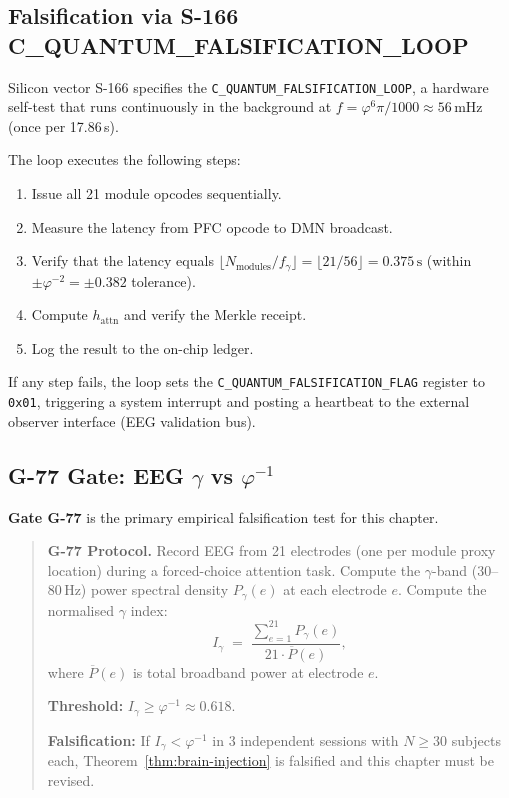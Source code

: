 \subsection{Falsification via S-166 C\_QUANTUM\_FALSIFICATION\_LOOP}
\label{sec:73:falsification-loop}

Silicon vector S-166 specifies the
\texttt{C\_QUANTUM\_FALSIFICATION\_LOOP}, a hardware self-test
that runs continuously in the background at
$f = \varphi^{6}\pi / 1000 \approx 56\,\mathrm{mHz}$ (once per
17.86\,s).

The loop executes the following steps:
\begin{enumerate}
  \item Issue all 21 module opcodes sequentially.
  \item Measure the latency from PFC opcode to DMN broadcast.
  \item Verify that the latency equals
        $\lfloor N_{\text{modules}} / f_{\gamma} \rfloor
         = \lfloor 21 / 56 \rfloor = 0.375\,\mathrm{s}$
        (within $\pm \varphi^{-2} = \pm 0.382$ tolerance).
  \item Compute $h_{\text{attn}}$ and verify the Merkle receipt.
  \item Log the result to the on-chip ledger.
\end{enumerate}

If any step fails, the loop sets the
\texttt{C\_QUANTUM\_FALSIFICATION\_FLAG} register to \texttt{0x01},
triggering a system interrupt and posting a heartbeat to the
external observer interface (EEG validation bus).

\subsection{G-77 Gate: EEG $\gamma$ vs $\varphi^{-1}$}
\label{sec:73:g77}

\textbf{Gate G-77} is the primary empirical falsification test
for this chapter.

\begin{quote}
\textbf{G-77 Protocol.}
Record EEG from 21 electrodes (one per module proxy location)
during a forced-choice attention task.
Compute the $\gamma$-band (30--80\,Hz) power spectral density
$P_{\gamma}(e)$ at each electrode $e$.
Compute the normalised $\gamma$ index:
\[
  I_{\gamma} \;=\; \frac{\sum_{e=1}^{21} P_{\gamma}(e)}
                        {21 \cdot \overline{P}(e)},
\]
where $\overline{P}(e)$ is total broadband power at electrode $e$.

\textbf{Threshold:} $I_{\gamma} \geq \varphi^{-1} \approx 0.618$.

\textbf{Falsification:} If $I_{\gamma} < \varphi^{-1}$ in 3
independent sessions with $N \geq 30$ subjects each,
Theorem~\ref{thm:brain-injection} is falsified
and this chapter must be revised.
\end{quote}

